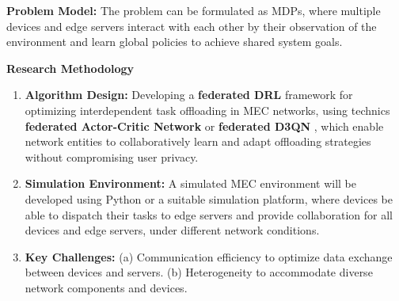 \documentclass[12pt]{article}
\begin{document}
	


\vspace{3mm}

\noindent\textbf{\large Problem Model: } The problem can be formulated as MDPs, where multiple devices and edge servers interact with each other by their observation of the environment and learn global policies to achieve shared system goals.
\noindent



\vspace{5mm}

\noindent\textbf{\large Research Methodology}

\begin{enumerate} \item \textbf{Algorithm Design:} Developing a  \textbf{federated DRL} framework for optimizing interdependent task offloading in MEC networks, using technics \textbf{federated Actor-Critic Network} \cite{zhu2021federated} or \textbf{federated D3QN} \cite{nguyen2021federated}, which enable network entities to collaboratively learn and adapt offloading strategies without compromising user privacy. \item \textbf{Simulation Environment:} A simulated MEC environment will be developed using Python or a suitable simulation platform, where devices be able to dispatch their tasks to edge servers and provide collaboration for all devices and edge servers, under different network conditions. 
	
	
	\item \textbf{Key Challenges:} (a) Communication efficiency to optimize data exchange between devices and servers.  (b) Heterogeneity to accommodate diverse network components and devices.
\end{enumerate}






\end{document}
